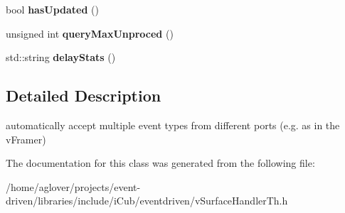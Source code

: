 \begin{DoxyCompactItemize}
\item 
bool {\bfseries has\+Updated} ()\hypertarget{classev_1_1syncvstreams_adff155da0d9cf739725127c446b1e575}{}\label{classev_1_1syncvstreams_adff155da0d9cf739725127c446b1e575}

\item 
unsigned int {\bfseries query\+Max\+Unproced} ()\hypertarget{classev_1_1syncvstreams_a481bbbc4b4a0b4d7721e630da92de71c}{}\label{classev_1_1syncvstreams_a481bbbc4b4a0b4d7721e630da92de71c}

\item 
std\+::string {\bfseries delay\+Stats} ()\hypertarget{classev_1_1syncvstreams_a40bb750373f2b6d406e57bbd70bc40b1}{}\label{classev_1_1syncvstreams_a40bb750373f2b6d406e57bbd70bc40b1}

\end{DoxyCompactItemize}


\subsection{Detailed Description}
automatically accept multiple event types from different ports (e.\+g. as in the v\+Framer) 

The documentation for this class was generated from the following file\+:\begin{DoxyCompactItemize}
\item 
/home/aglover/projects/event-\/driven/libraries/include/i\+Cub/eventdriven/v\+Surface\+Handler\+Th.\+h\end{DoxyCompactItemize}
